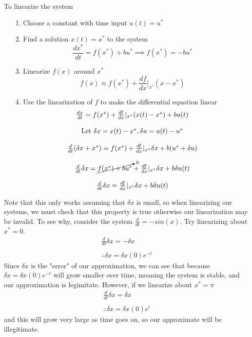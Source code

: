 \documentclass{article}
\begin{document}
To linearize the system
\begin{itemize}
    \item[1.] Choose a constant with time input $u(t) = u^*$
    \item[2.] Find a solution $x(t)=x^*$ to the system
            $$\frac{dx^*}{dt}=f(x^*)+bu^* \implies f(x^*)=-bu^*$$
    \item[3.] Linearize $f(x)$ around $x^*$
            $$f(x) \approx f(x^*)+\frac{df}{dx}|_{x^*} (x-x^*)$$
    \item[4.] Use the linearization of $f$ to make the differential equation linear
            \[
                \begin{array}{c}
                    \frac{dx}{dt} = f(x^*)+\frac{df}{dx}|_{x^*} (x(t)-x^*)+bu(t)\\\\
                    \text{Let }\delta x = x(t)-x^*, \delta u = u(t) - u^*\\\\
                    \frac{d}{dt}(\delta x +x^*) = f(x^*)+\frac{df}{dx}|_{x^*} \delta x + b (u^*+\delta u)\\\\
                    \frac{d}{dt}\delta x = \cancelto{0}{f(x^*)+bu^*} + \frac{df}{dx}|_{x^*} \delta x + b \delta u(t)\\\\
                    \frac{d}{dt}\delta x =  \frac{df}{dx}|_{x^*} \delta x + b \delta u(t)
                \end{array}
            \] 
\end{itemize}
Note that this only works assuming that $\delta x$ is small, so when linearizing our systems, 
we must check that this property is true otherwise our linearization may be invalid. 
To see why, consider the system $\frac{d}{dt}=-sin(x)$. Try linearizing about $x^*=0$.
\[
    \begin{array} {c}
        \frac{d}{dt}\delta x = -\delta x\\\\
        \therefore \delta x = \delta x(0)e^{-t}
    \end{array}
\]
Since $\delta x$ is the "error" of our approximation, we can see that because $\delta x = \delta x(0)e^{-t}$ will grow smaller over time, meaning the system is stable, and our approximation is legimitate.
However, if we linearize about $x^*=\pi$
\[
    \begin{array} {c}
        \frac{d}{dt}\delta x = \delta x\\\\
        \therefore \delta x = \delta x(0)e^{t}
    \end{array}
\]
and this will grow very large as time goes on, so our approximate will be illegitimate.
\end{document}
